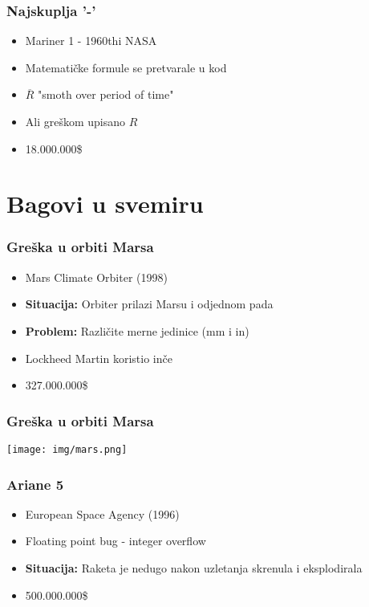 \documentclass{beamer}
\begin{document}
\begin{frame}[fragile]
    \frametitle{Najskuplja '-'}
    
    \begin{itemize}
        \item Mariner 1 - 1960thi NASA \newline
        \item Matematičke formule se pretvarale u kod \newline
        \item $\overline{R}$ "smoth over period of time" \newline
        \item Ali greškom upisano $R$ \newline
        \item 18.000.000\$
    \end{itemize}
\end{frame}

\section*{Bagovi u svemiru}
\begin{frame}
    \frametitle{Greška u orbiti Marsa}
    \begin{itemize}
        \item Mars Climate Orbiter (1998) \newline
        \item \textbf{Situacija:} Orbiter prilazi Marsu i odjednom pada \newline
        \item \textbf{Problem: } Različite merne jedinice (mm i in) \newline
        \item Lockheed Martin koristio inče \newline
        \item 327.000.000\$
    \end{itemize}
\end{frame}

\begin{frame}
    \frametitle{Greška u orbiti Marsa}
    \begin{center}
        \texttt{[image: img/mars.png]}
    \end{center}
\end{frame}

\begin{frame}
    \frametitle{Ariane 5}
    \begin{itemize}
        \item European Space Agency (1996)\newline
        \item Floating point bug - integer overflow \newline
        \item \textbf{Situacija:} Raketa je nedugo nakon uzletanja skrenula i eksplodirala \newline
        \item 500.000.000\$
    \end{itemize}
\end{frame}
\end{document}
